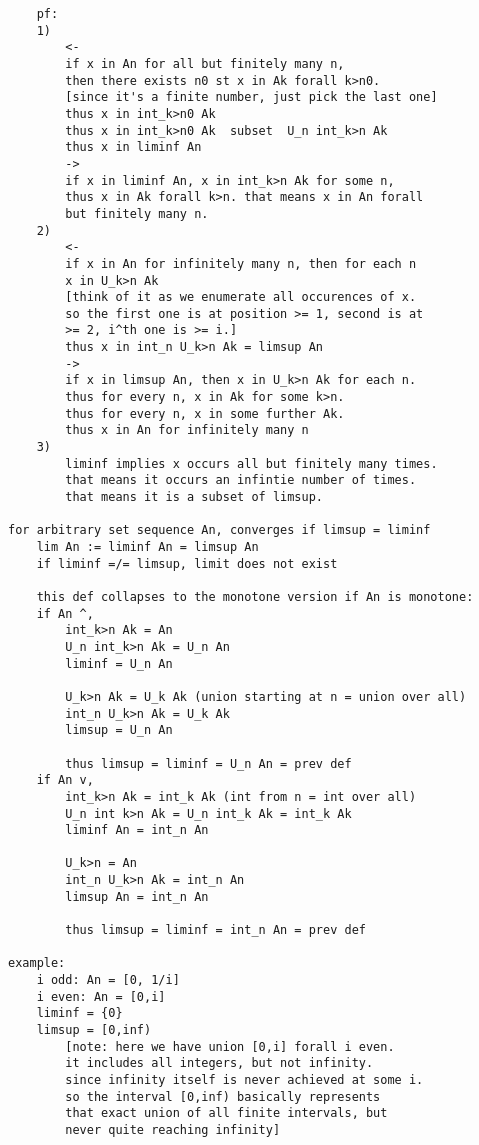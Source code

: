 \documentclass{article}
\begin{document}
\begin{flushleft}
\begin{verbatim}
    pf: 
    1) 
        <- 
        if x in An for all but finitely many n, 
        then there exists n0 st x in Ak forall k>n0.
        [since it's a finite number, just pick the last one]
        thus x in int_k>n0 Ak 
        thus x in int_k>n0 Ak  subset  U_n int_k>n Ak 
        thus x in liminf An 
        -> 
        if x in liminf An, x in int_k>n Ak for some n,
        thus x in Ak forall k>n. that means x in An forall 
        but finitely many n. 
    2)
        <- 
        if x in An for infinitely many n, then for each n 
        x in U_k>n Ak 
        [think of it as we enumerate all occurences of x. 
        so the first one is at position >= 1, second is at 
        >= 2, i^th one is >= i.]
        thus x in int_n U_k>n Ak = limsup An 
        -> 
        if x in limsup An, then x in U_k>n Ak for each n.
        thus for every n, x in Ak for some k>n. 
        thus for every n, x in some further Ak. 
        thus x in An for infinitely many n
    3) 
        liminf implies x occurs all but finitely many times.
        that means it occurs an infintie number of times.
        that means it is a subset of limsup. 

for arbitrary set sequence An, converges if limsup = liminf
    lim An := liminf An = limsup An 
    if liminf =/= limsup, limit does not exist 
    
    this def collapses to the monotone version if An is monotone:
    if An ^, 
        int_k>n Ak = An 
        U_n int_k>n Ak = U_n An 
        liminf = U_n An 

        U_k>n Ak = U_k Ak (union starting at n = union over all)
        int_n U_k>n Ak = U_k Ak 
        limsup = U_n An 

        thus limsup = liminf = U_n An = prev def 
    if An v,
        int_k>n Ak = int_k Ak (int from n = int over all)
        U_n int k>n Ak = U_n int_k Ak = int_k Ak 
        liminf An = int_n An 

        U_k>n = An 
        int_n U_k>n Ak = int_n An 
        limsup An = int_n An 

        thus limsup = liminf = int_n An = prev def 

example: 
    i odd: An = [0, 1/i]
    i even: An = [0,i]
    liminf = {0}
    limsup = [0,inf)
        [note: here we have union [0,i] forall i even.
        it includes all integers, but not infinity. 
        since infinity itself is never achieved at some i.
        so the interval [0,inf) basically represents 
        that exact union of all finite intervals, but 
        never quite reaching infinity]


\end{verbatim}
\end{flushleft}
\end{document}
